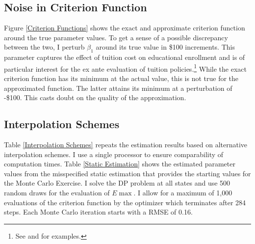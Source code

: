\subsection{Noise in Criterion Function}\label{Noise in Criterion Function}
Figure \ref{Criterion Functions} shows the exact and approximate criterion function around the true parameter values. To get a sense of a possible discrepancy between the two, I perturb $\beta_1$ around its true value in \$100 increments. This parameter captures the effect of tuition cost on educational enrollment and is of particular interest for the ex ante evaluation of tuition policies.\footnote{See \citet{Keane.1997} and \citet{Keane.2001} for examples.} While the exact criterion function has its minimum at the actual value, this is not true for the approximated function. The latter attains its minimum at a perturbation of -\$100. This casts doubt on the quality of the approximation. 
\subsection{Interpolation Schemes}\label{Appendix Interpolation Schemes}
Table \ref{Interpolation Schemes} repeats the estimation results based on alternative interpolation schemes. I use a single processor to ensure comparability of computation times. Table \ref{Static Estimation} shows the estimated parameter values from the misspecified static estimation that provides the starting values for the Monte Carlo Exercise. I solve the DP problem at all states and use 500 random draws for the evaluation of $E\max$. I allow for a maximum of 1,000 evaluations of the criterion function by the optimizer which terminates after 284 steps. Each Monte Carlo iteration starts with a RMSE of 0.16.
